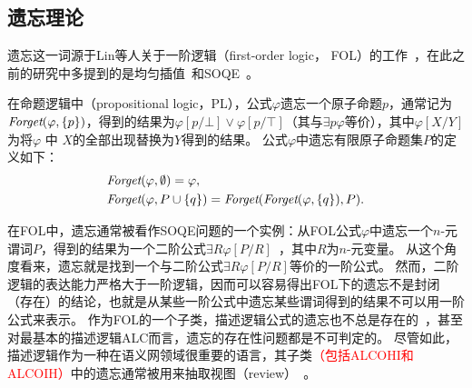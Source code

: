 \subsection{遗忘理论}\label{chapter01:forgetting}
遗忘这一词源于Lin等人关于一阶逻辑（first-order logic， FOL）的工作~\cite{lin1994forget}，在此之前的研究中多提到的是均匀插值~\cite{visser1996uniform,konev2009forgetting}和SOQE~\cite{ackermann1935untersuchungen}。

在命题逻辑中（propositional logic，PL），公式$\varphi$遗忘一个原子命题$p$，通常记为$\textit{Forget}(\varphi,\{p\})$，得到的结果为$\varphi[p/\bot] \vee \varphi[p/\top]$（其与$\exists p\varphi$等价），其中$\varphi[X/Y]$为将$\varphi$ 中 $X$的全部出现替换为$Y$得到的结果。
公式$\varphi$中遗忘有限原子命题集$P$的定义如下：
\begin{alignat*}{2}
	&  \Forget(\varphi, \emptyset) = \varphi, \qquad \\ %
	&  \Forget(\varphi, P \cup \{q\})  = \Forget(\Forget(\varphi, \{q\}), P).
	\nonumber
\end{alignat*}

在FOL中，遗忘通常被看作SOQE问题的一个实例：从FOL公式$\varphi$中遗忘一个$n$-元谓词$P$，得到的结果为一个二阶公式$\exists R \varphi[P/R]$~\cite{lin1994forget}，其中$R$为$n$-元变量。
从这个角度看来，遗忘就是找到一个与二阶公式$\exists R \varphi[P/R]$等价的一阶公式。
然而，二阶逻辑的表达能力严格大于一阶逻辑，因而可以容易得出FOL下的遗忘不是封闭（存在）的结论，也就是从某些一阶公式中遗忘某些谓词得到的结果不可以用一阶公式来表示。
作为FOL的一个子类，描述逻辑公式的遗忘也不总是存在的~\cite{DBLP:journals/ai/KonevL0W13}，甚至对最基本的描述逻辑{\cal ALC}而言，遗忘的存在性问题都是不可判定的。
尽管如此，描述逻辑作为一种在语义网领域很重要的语言，其子类\textcolor{red}{（包括{\cal ALCOHI}和{\cal ALCOIH}）}中的遗忘通常被用来抽取视图（review）~\cite{Wang:AMAI:2010,DBLP:conf/ijcai/LutzW11,Konev:JAIR:2012,DBLP:conf/ijcai/ZhaoS17,DBLP:conf/aaai/ZhaoSWZF20}。

